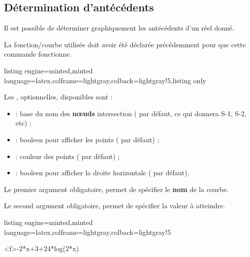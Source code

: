 \documentclass[11pt,a4paper]{ltxdoc}
\begin{document}
\pagebreak

\subsection{Détermination d'antécédents}\label{defanteced}

Il est possible de déterminer graphiquement les antécédents d'un réel donné.

La fonction/courbe utilisée doit avoir été déclarée précédemment pour que cette commande fonctionne.

\begin{tcblisting}{listing engine=minted,minted language=latex,colframe=lightgray,colback=lightgray!5,listing only}
\end{tcblisting}

Les \MontreCode{[clés]}, optionnelles, disponibles sont :

\smallskip

\begin{itemize}
	\item {} : base du nom des \textbf{nœuds} intersection ( par défaut, ce qui donnera \textsf{S-1}, \textsf{S-2}, etc) ;
	\item {} : booleen pour afficher les points ( par défaut) ;
	\item {} : couleur des points ( par défaut) ;
	\item {} : booleen pour afficher la droite horizontale ( par défaut).
\end{itemize}

\smallskip

Le premier argument obligatoire, permet de spécifier le \textbf{nom} de la courbe.

\smallskip

Le second argument obligatoire, permet de spécifier la valeur à atteindre.

\begin{tcblisting}{listing engine=minted,minted language=latex,colframe=lightgray,colback=lightgray!5}
\begin{GraphiqueTikz}%
	[x=0.9cm,y=0.425cm,Xmin=4,Xmax=20,Origx=4,
	Ymin=40,Ymax=56,Ygrille=2,Ygrilles=1,Origy=40]
	{-2*x+3+24*log(2*x)}
\end{GraphiqueTikz}
\end{tcblisting}
\end{document}
